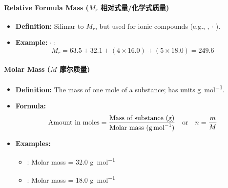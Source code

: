 \paragraph{Relative Formula Mass ($M_r$ 相对式量/化学式质量)}
\begin{itemize}
    \item \textbf{Definition:} Silimar to $M_r$, but used for ionic compounds (e.g., ,  $\cdot$ ).
    \item \textbf{Example:}  $\cdot$ :
    \begin{equation}
        M_r = 63.5 + 32.1 + (4 \times 16.0) + (5 \times 18.0) = 249.6
    \end{equation}
\end{itemize}

\paragraph{Molar Mass ($M$ 摩尔质量)}
\begin{itemize}
    \item \textbf{Definition:} The mass of one mole of a substance; has units \unit{g.mol^{-1}}.
    \item \textbf{Formula:}
    \begin{equation}
        \text{Amount in moles} = \frac{\text{Mass of substance (g)}}{\text{Molar mass (\unit{g.mol^{-1}})}} \quad
        \text{or} \quad n = \frac{m}{M}
    \end{equation}
    \item \textbf{Examples:}
    \begin{itemize}
        \item {}: Molar mass = 32.0 \unit{g.mol^{-1}}
        \item {}: Molar mass = 18.0 \unit{g.mol^{-1}}
    \end{itemize}
\end{itemize}

